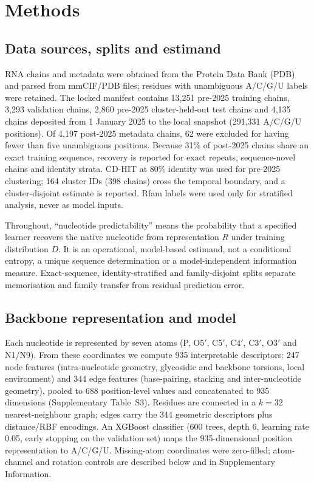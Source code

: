 \section{Methods}

\subsection{Data sources, splits and estimand}
RNA chains and metadata were obtained from the Protein Data Bank (PDB) and parsed
from mmCIF/PDB files; residues with unambiguous A/C/G/U labels were retained.
The locked manifest contains 13,251 pre-2025 training chains, 3,293 validation
chains, 2,860 pre-2025 cluster-held-out test chains and 4,135 chains deposited
from 1 January 2025 to the local snapshot (291,331 A/C/G/U positions). Of 4,197
post-2025 metadata chains, 62 were excluded for having fewer than five unambiguous
positions. Because 31\% of post-2025 chains share an exact training sequence,
recovery is reported for exact repeats, sequence-novel chains and identity strata.
CD-HIT at 80\% identity was used for pre-2025 clustering; 164 cluster IDs (398
chains) cross the temporal boundary, and a cluster-disjoint estimate is reported.
Rfam labels were used only for stratified analysis, never as model inputs.

Throughout, ``nucleotide predictability'' means the probability that a specified
learner recovers the native nucleotide from representation $R$ under training
distribution $D$. It is an operational, model-based estimand, not a conditional
entropy, a unique sequence determination or a model-independent information
measure. Exact-sequence, identity-stratified and family-disjoint splits separate
memorisation and family transfer from residual prediction error.

\subsection{Backbone representation and model}
Each nucleotide is represented by seven atoms (P, O5$'$, C5$'$, C4$'$, C3$'$,
O3$'$ and N1/N9). From these coordinates we compute 935 interpretable descriptors:
247 node features (intra-nucleotide geometry, glycosidic and backbone torsions,
local environment) and 344 edge features (base-pairing, stacking and
inter-nucleotide geometry), pooled to 688 position-level values and concatenated
to 935 dimensions (Supplementary Table~S3). Residues are connected in a
$k=32$ nearest-neighbour graph; edges carry the 344 geometric descriptors plus
distance/RBF encodings. An XGBoost classifier (600 trees, depth 6, learning rate
0.05, early stopping on the validation set) maps the 935-dimensional position
representation to A/C/G/U. Missing-atom coordinates were zero-filled; atom-channel
and rotation controls are described below and in Supplementary Information.

